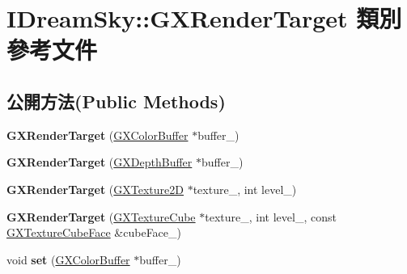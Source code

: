 \hypertarget{class_i_dream_sky_1_1_g_x_render_target}{}\section{I\+Dream\+Sky\+:\+:G\+X\+Render\+Target 類別 參考文件}
\label{class_i_dream_sky_1_1_g_x_render_target}
\subsection*{公開方法(Public Methods)}
\begin{DoxyCompactItemize}
\item 
{\bfseries G\+X\+Render\+Target} (\hyperlink{class_i_dream_sky_1_1_g_x_color_buffer}{G\+X\+Color\+Buffer} $\ast$buffer\+\_\+)\hypertarget{class_i_dream_sky_1_1_g_x_render_target_a987d8275d3382377e98b3dc45632eaa8}{}\label{class_i_dream_sky_1_1_g_x_render_target_a987d8275d3382377e98b3dc45632eaa8}

\item 
{\bfseries G\+X\+Render\+Target} (\hyperlink{class_i_dream_sky_1_1_g_x_depth_buffer}{G\+X\+Depth\+Buffer} $\ast$buffer\+\_\+)\hypertarget{class_i_dream_sky_1_1_g_x_render_target_aeb6b10397c079c42125330979111ce29}{}\label{class_i_dream_sky_1_1_g_x_render_target_aeb6b10397c079c42125330979111ce29}

\item 
{\bfseries G\+X\+Render\+Target} (\hyperlink{class_i_dream_sky_1_1_g_x_texture2_d}{G\+X\+Texture2D} $\ast$texture\+\_\+, int level\+\_\+)\hypertarget{class_i_dream_sky_1_1_g_x_render_target_a81059e26561e4009e7d558333725c802}{}\label{class_i_dream_sky_1_1_g_x_render_target_a81059e26561e4009e7d558333725c802}

\item 
{\bfseries G\+X\+Render\+Target} (\hyperlink{class_i_dream_sky_1_1_g_x_texture_cube}{G\+X\+Texture\+Cube} $\ast$texture\+\_\+, int level\+\_\+, const \hyperlink{class_i_dream_sky_1_1_g_x_texture_cube_face}{G\+X\+Texture\+Cube\+Face} \&cube\+Face\+\_\+)\hypertarget{class_i_dream_sky_1_1_g_x_render_target_aa783a7e9404ed18e2d71c77a7dd3a2dc}{}\label{class_i_dream_sky_1_1_g_x_render_target_aa783a7e9404ed18e2d71c77a7dd3a2dc}

\item 
void {\bfseries set} (\hyperlink{class_i_dream_sky_1_1_g_x_color_buffer}{G\+X\+Color\+Buffer} $\ast$buffer\+\_\+)\hypertarget{class_i_dream_sky_1_1_g_x_render_target_a30a2a71a26c2735c55a66debbefb4254}{}\label{class_i_dream_sky_1_1_g_x_render_target_a30a2a71a26c2735c55a66debbefb4254}


\end{DoxyCompactItemize}

